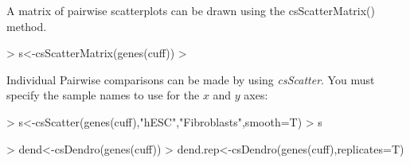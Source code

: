 \documentclass[10pt]{article}
\newcommand{\Rmethod}[1]{{\textit{#1}}}
\begin{document}
\begin{figure}[htp]
	\begin{center}
	\qquad
	\end{center}
\end{figure}

A matrix of pairwise scatterplots can be drawn using the csScatterMatrix()
method.

\begin{Schunk}
\begin{Sinput}
> s<-csScatterMatrix(genes(cuff))
> 
\end{Sinput}
\end{Schunk}

\begin{figure}[htp]
	\begin{center}
	\end{center}
\end{figure}


Individual Pairwise comparisons can be made by using \Rmethod{csScatter}. You
must specify the sample names to use for the $x$ and $y$ axes:
\begin{Schunk}
\begin{Sinput}
> s<-csScatter(genes(cuff),"hESC","Fibroblasts",smooth=T)
> s
\end{Sinput}
\end{Schunk}

\begin{figure}[htp]
	\begin{center}
	\end{center}
\end{figure}

\begin{Schunk}
\begin{Sinput}
> dend<-csDendro(genes(cuff))
> dend.rep<-csDendro(genes(cuff),replicates=T)
\end{Sinput}
\end{Schunk}
\end{document}
